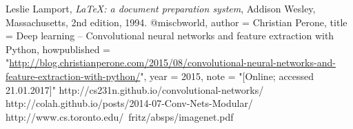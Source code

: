 \documentclass[12pt]{beamer}
\begin{document}
\begin{thebibliography}{9}
\small
{}
  Leslie Lamport,
  \emph{\LaTeX: a document preparation system},
  Addison Wesley, Massachusetts,
  2nd edition,
  1994.
@misc{bworld,
  author = {Christian Perone},
  title = {{Deep learning – Convolutional neural networks and feature extraction with Python}},
  howpublished = "\url{http://blog.christianperone.com/2015/08/convolutional-neural-networks-and-feature-extraction-with-python/}",
  year = {2015}, 
  note = "[Online; accessed 21.01.2017]"
}
http://cs231n.github.io/convolutional-networks/
http://colah.github.io/posts/2014-07-Conv-Nets-Modular/
http://www.cs.toronto.edu/~fritz/absps/imagenet.pdf
\end{thebibliography}
\end{document}
